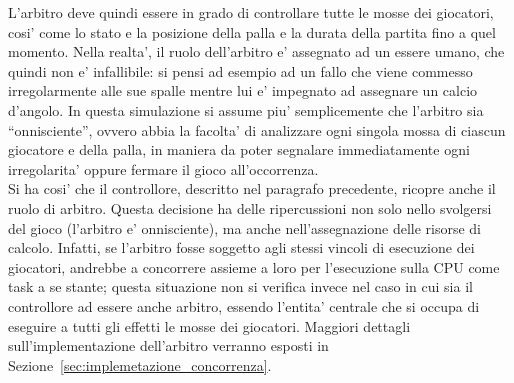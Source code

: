 L'arbitro deve quindi essere in grado di controllare tutte le mosse dei giocatori, cosi' come lo stato e la posizione della palla e la durata della partita fino a quel momento. Nella realta', il ruolo dell'arbitro e' assegnato ad un essere umano, che quindi non e' infallibile: si pensi ad esempio ad un fallo che viene commesso irregolarmente alle sue spalle mentre lui e' impegnato ad assegnare un calcio d'angolo. In questa simulazione si assume piu' semplicemente che l'arbitro sia ``onnisciente'', ovvero abbia la facolta' di analizzare ogni singola mossa di ciascun giocatore e della palla, in maniera da poter segnalare immediatamente ogni irregolarita' oppure fermare il gioco all'occorrenza.\\

Si ha cosi' che il controllore, descritto nel paragrafo precedente, ricopre anche il ruolo di arbitro. Questa decisione ha delle ripercussioni non solo nello svolgersi del gioco (l'arbitro e' onnisciente), ma anche nell'assegnazione delle risorse di calcolo. Infatti, se l'arbitro fosse soggetto agli stessi vincoli di esecuzione dei giocatori, andrebbe a concorrere assieme a loro per l'esecuzione sulla CPU come task a se stante; questa situazione non si verifica invece nel caso in cui sia il controllore ad essere anche arbitro, essendo l'entita' centrale che si occupa di eseguire a tutti gli effetti le mosse dei giocatori. Maggiori dettagli sull'implementazione dell'arbitro verranno esposti in Sezione~\ref{sec:implemetazione_concorrenza}.\\

